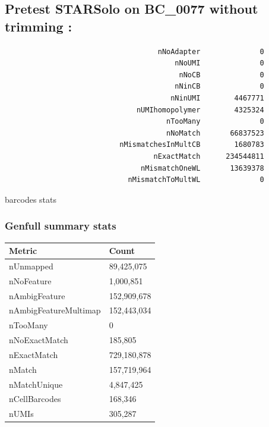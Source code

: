 \documentclass[
  11pt,
  a4paper,
]{report}
\begin{document}
\subsection{Pretest STARSolo on BC\_0077 without trimming
:}\label{pretest-starsolo-on-bc_0077-without-trimming}

\begin{verbatim}
                                    nNoAdapter              0
                                        nNoUMI              0
                                         nNoCB              0
                                        nNinCB              0
                                       nNinUMI        4467771
                               nUMIhomopolymer        4325324
                                      nTooMany              0
                                      nNoMatch       66837523
                           nMismatchesInMultCB        1680783
                                   nExactMatch      234544811
                                nMismatchOneWL       13639378
                             nMismatchToMultWL              0
\end{verbatim}

barcodes stats

\subsubsection{Genfull summary stats}\label{genfull-summary-stats}

\begin{longtable}[]{@{}ll@{}}
\toprule\noalign{}
Metric & Count \\
\midrule\noalign{}
\endhead
\bottomrule\noalign{}
\endlastfoot
nUnmapped & 89,425,075 \\
nNoFeature & 1,000,851 \\
nAmbigFeature & 152,909,678 \\
nAmbigFeatureMultimap & 152,443,034 \\
nTooMany & 0 \\
nNoExactMatch & 185,805 \\
nExactMatch & 729,180,878 \\
nMatch & 157,719,964 \\
nMatchUnique & 4,847,425 \\
nCellBarcodes & 168,346 \\
nUMIs & 305,287 \\
\end{longtable}
\end{document}
